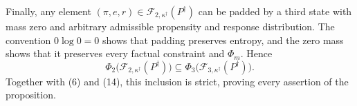 Finally, any element \((\pi,e,r)\in\mathcal F_{2,\kappa^\dagger}(P^\dagger)\) can be padded by a third state with mass zero and arbitrary admissible propensity and response distribution.  The convention \(0\log0=0\) shows that padding preserves entropy, and the zero mass shows that it preserves every factual constraint and \(\Phi_m\).  Hence
\[
\Phi_2\bigl(\mathcal F_{2,\kappa^\dagger}(P^\dagger)\bigr)
\subseteq
\Phi_3\bigl(\mathcal F_{3,\kappa^\dagger}(P^\dagger)\bigr).
\]
Together with (6) and (14), this inclusion is strict, proving every assertion of the proposition.
